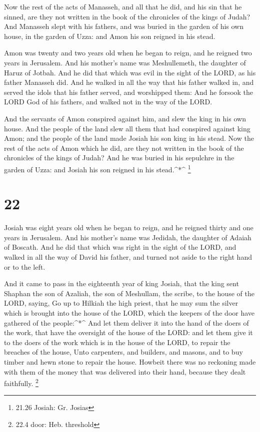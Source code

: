  Now the rest of the acts of Manasseh, and all that he did,
and his sin that he sinned, are they not written in the book of the
chronicles of the kings of Judah?  And Manasseh slept with
his fathers, and was buried in the garden of his own house, in the
garden of Uzza: and Amon his son reigned in his stead.

 Amon was twenty and two years old when he began to reign,
and he reigned two years in Jerusalem. And his mother's name was
Meshullemeth, the daughter of Haruz of Jotbah.  And he did
that which was evil in the sight of the LORD, as his father Manasseh
did.  And he walked in all the way that his father walked
in, and served the idols that his father served, and worshipped them:
 And he forsook the LORD God of his fathers, and walked not
in the way of the LORD.

 And the servants of Amon conspired against him, and slew
the king in his own house.  And the people of the land slew
all them that had conspired against king Amon; and the people of the
land made Josiah his son king in his stead.  Now the rest
of the acts of Amon which he did, are they not written in the book of
the chronicles of the kings of Judah?  And he was buried in
his sepulchre in the garden of Uzza: and Josiah his son reigned in his
stead.\^{}*\^{} \footnote{21.26 Josiah: Gr. Josias}

\hypertarget{section-21}{%
\section{22}\label{section-21}}

 Josiah was eight years old when he began to reign, and he
reigned thirty and one years in Jerusalem. And his mother's name was
Jedidah, the daughter of Adaiah of Boscath.  And he did that
which was right in the sight of the LORD, and walked in all the way of
David his father, and turned not aside to the right hand or to the left.

 And it came to pass in the eighteenth year of king Josiah,
that the king sent Shaphan the son of Azaliah, the son of Meshullam, the
scribe, to the house of the LORD, saying,  Go up to Hilkiah
the high priest, that he may sum the silver which is brought into the
house of the LORD, which the keepers of the door have gathered of the
people:\^{}*\^{}  And let them deliver it into the hand of
the doers of the work, that have the oversight of the house of the LORD:
and let them give it to the doers of the work which is in the house of
the LORD, to repair the breaches of the house,  Unto
carpenters, and builders, and masons, and to buy timber and hewn stone
to repair the house.  Howbeit there was no reckoning made
with them of the money that was delivered into their hand, because they
dealt faithfully. \footnote{22.4 door: Heb. threshold}

